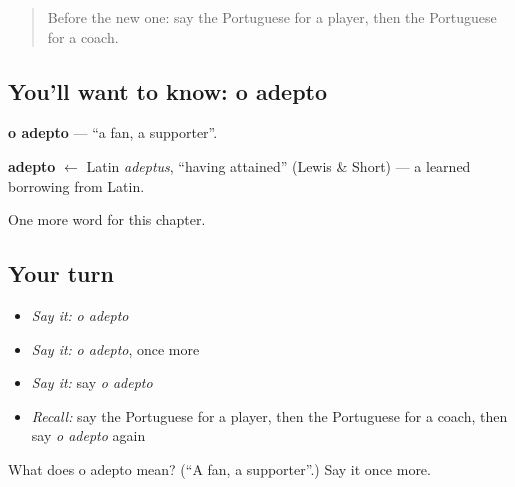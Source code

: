 \label{lesson:PT-C252-adepto}



\begin{quote}
Before the new one: say the Portuguese for a player, then the Portuguese for a coach.
\end{quote}

\subsection*{You'll want to know: o adepto}
\textbf{o adepto} — \textquotedblleft{}a fan, a supporter\textquotedblright{}.

\begin{cousinweb}
\textbf{adepto} $\leftarrow$ Latin \emph{adeptus}, \textquotedblleft{}having attained\textquotedblright{} (Lewis \& Short) — a learned borrowing from Latin.
\end{cousinweb}

\begin{grammarlens}[title={What you've built}]
One more word for this chapter.
\end{grammarlens}

\subsection*{Your turn}
\begin{itemize}
\raggedright
  \item \emph{Say it:} \emph{o adepto}
  \item \emph{Say it:} \emph{o adepto}, once more
  \item \emph{Say it:} say \emph{o adepto}
  \item \emph{Recall:} say the Portuguese for a player, then the Portuguese for a coach, then say \emph{o adepto} again
\end{itemize}

\begin{tcolorbox}[breakable,colback=teal!4,colframe=teal!35!black,title={Before you move on}]
What does o adepto mean? (\textquotedblleft{}A fan, a supporter\textquotedblright{}.) Say it once more.
\end{tcolorbox}
